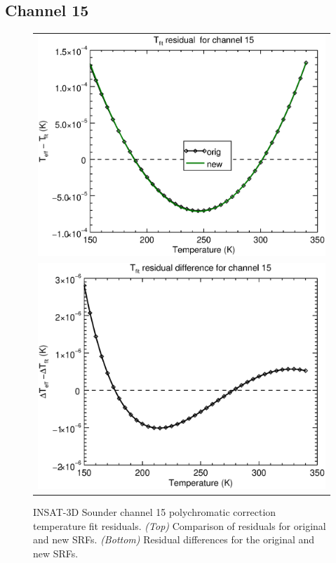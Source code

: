 \subsection{Channel 15}
\begin{figure}[H]
  \centering
  \begin{tabular}{c}
    \includegraphics[scale=0.55]{graphics/sndr/tfit/sndr_insat3d-15.tfit.eps} \\
    \includegraphics[scale=0.55]{graphics/sndr/tfit/sndr_insat3d-15.tfit.difference.eps}
  \end{tabular}
  \caption{INSAT-3D Sounder channel 15 polychromatic correction temperature fit residuals. \emph{(Top)} Comparison of residuals for original and new SRFs. \emph{(Bottom)} Residual differences for the original and new SRFs.}
  \label{fig:sndr_ch15_tfit}
\end{figure}

